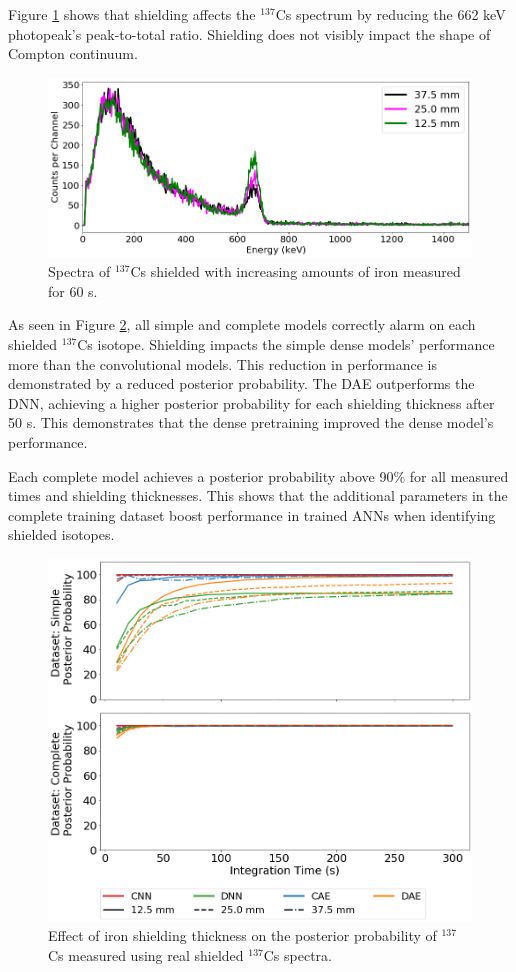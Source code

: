 Figure \ref{fig:shielded_cs137} shows that shielding affects the $^{137}$Cs spectrum by reducing the 662 keV photopeak's peak-to-total ratio. Shielding does not visibly impact the shape of Compton continuum. 

\begin{figure}[H]
	\centering
	\includegraphics[width=0.8\linewidth]{images/shielded_cs137}
	\caption{Spectra of $^{137}$Cs shielded with increasing amounts of iron measured for 60 s.}
	\label{fig:shielded_cs137}
\end{figure}

As seen in Figure \ref{fig:iron_cs137}, all simple and complete models correctly alarm on each shielded $^{137}$Cs isotope. Shielding impacts the simple dense models' performance more than the convolutional models. This reduction in performance is demonstrated by a reduced posterior probability. The DAE outperforms the DNN, achieving a higher posterior probability for each shielding thickness after 50 s. This demonstrates that the dense pretraining improved the dense model's performance.

Each complete model achieves a posterior probability above 90\% for all measured times and shielding thicknesses. This shows that the additional parameters in the complete training dataset boost performance in trained ANNs when identifying shielded isotopes.

\begin{figure}[H]
	\centering
	\includegraphics[width=0.8\linewidth]{images/iron_cs137}
	\caption{Effect of iron shielding thickness on the posterior probability of $^{137}$Cs measured using real shielded $^{137}$Cs spectra.}
	\label{fig:iron_cs137}
\end{figure}




